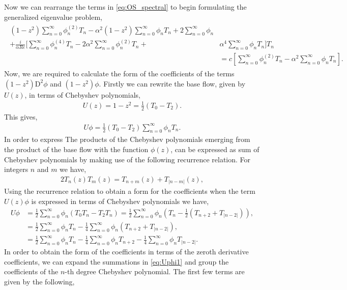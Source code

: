 \documentclass[a4paper, 12pt, twoside, openright]{article}
\numberwithin{equation}{section}
\begin{document}
Now we can rearrange the terms in \eqref{eq:OS_spectral} to begin formulating the generalized eigenvalue problem, 
\begin{align}
\begin{split}
(1-z^2)\sum_{n=0}^{\infty}\phi_n^{(2)} T_n - \alpha^2(1-z^2)\sum_{n=0}^{\infty}\phi_n T_n + 2\sum_{n=0}^{\infty}\phi_n & \\+ \frac{i}{\alpha Re}\Biggl[\sum_{n=0}^{\infty}\phi_n^{(4)} T_n - 2\alpha^2\sum_{n=0}^{\infty}\phi_n^{(2)} T_n + &\alpha^4\sum_{n=0}^{\infty}\phi_n T_n \Biggr] T_n \\&= c\left[\sum_{n=0}^{\infty}\phi_n^{(2)} T_n - \alpha^2\sum_{n=0}^{\infty}\phi_n T_n \right].
\end{split}
\end{align}
Now, we are required to calculate the form of the coefficients of the terms $(1-z^2)\mathrm{D^2}\phi$ and $(1-z^2)\phi$. Firstly we can rewrite the base flow, given by $U(z)$, in terms of Chebyshev polynomials, 
\begin{align}
U(z) = 1-z^2 = \frac{1}{2}\left(T_0 - T_2\right). 
\end{align}
This gives,
\begin{align}
U\phi = \frac{1}{2}\left(T_0 - T_2\right)\sum_{n=0}^{\infty}\phi_n T_n.  
\end{align}
In order to express 
The products of the Chebyshev polynomials emerging from the product of the base flow with the function $\phi(z)$, can be expressed as sum of Chebyshev polynomials by making use of the following recurrence relation. For integers $n$ and $m$ we have,
\begin{align}
2T_n(z)T_m(z) = T_{n+m}(z) + T_{|n-m|}(z),
\end{align}
Using the recurrence relation to obtain a form for the coefficients when the term $U(z)\phi$ is expressed in terms of Chebyshev polynomials we have,
\begin{align}
U\phi &= \frac{1}{2}\sum_{n=0}^{\infty}\phi_n (T_0T_n - T_2T_n) = \frac{1}{2}\sum_{n=0}^{\infty}\phi_n \left(T_n - \frac{1}{2}\left(T_{n+2}+T_{|n-2|}\right)\right), \\
 &= \frac{1}{2}\sum_{n=0}^{\infty}\phi_nT_n - \frac{1}{4}\sum_{n=0}^{\infty}\phi_n\left(T_{n+2}+T_{|n-2|}\right), \\
 &= \frac{1}{2}\sum_{n=0}^{\infty}\phi_nT_n - \frac{1}{4}\sum_{n=0}^{\infty}\phi_nT_{n+2} - \frac{1}{4}\sum_{n=0}^{\infty}\phi_nT_{|n-2|}. \label{eq:Uphi1}
\end{align}
In order to obtain the form of the coefficients in terms of the zeroth derivative coefficients, we can expand the summations in \eqref{eq:Uphi1} and group the coefficients of the $n$-th degree Chebyshev polynomial. The first few terms are given by the following, 
\end{document}
